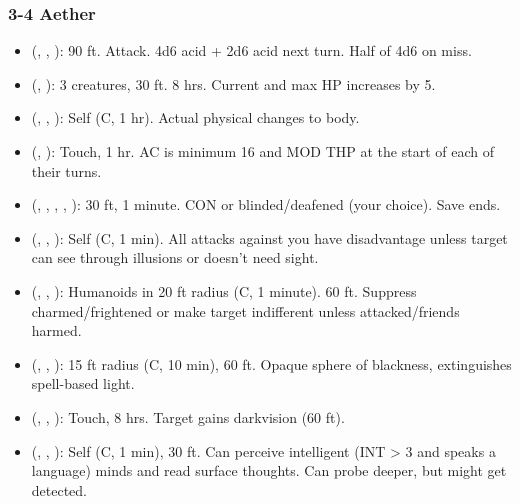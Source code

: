 \subsubsection{3-4 Aether}
\begin{itemize}
	\item {} (, , ): 90 ft. Attack. 4d6 acid + 2d6 acid next turn. Half of 4d6 on miss.
	\item {} (, ): 3 creatures, 30 ft. 8 hrs. Current and max HP increases by 5.
	\item {} (, , ): Self (C, 1 hr). Actual physical changes to body.
	\item {} (, ): Touch, 1 hr. AC is minimum 16 and MOD THP at the start of each of their turns.
	\item {} (, , , , ): 30 ft, 1 minute. CON or blinded/deafened (your choice). Save ends.
	\item {} (, , ): Self (C, 1 min). All attacks against you have disadvantage unless target can see through illusions or doesn't need sight.
	\item {} (, , ): Humanoids in 20 ft radius (C, 1 minute). 60 ft. Suppress charmed/frightened or make target indifferent unless attacked/friends harmed.
	\item {} (, , ): 15 ft radius (C, 10 min), 60 ft. Opaque sphere of blackness, extinguishes spell-based light.
	\item {} (, , ): Touch, 8 hrs. Target gains darkvision (60 ft).
	\item {} (, , ): Self (C, 1 min), 30 ft. Can perceive intelligent (INT > 3 and speaks a language) minds and read surface thoughts. Can probe deeper, but might get detected.

\end{itemize}
